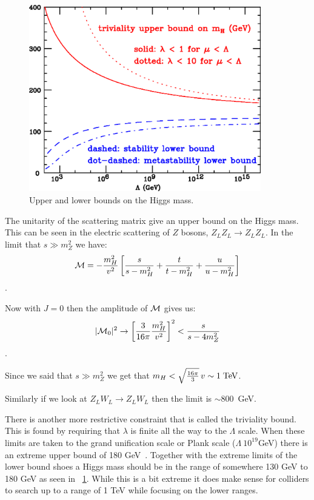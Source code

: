 \begin{figure}[htb]
\centering
\includegraphics[width=0.9\textwidth]{StandardModel/bothbounds.eps}
\caption{Upper and lower bounds on the Higgs mass.~\cite{Ridolfi2001} }
\label{fig:bothbounds}
\end{figure}



The unitarity of the scattering matrix give an upper bound on the Higgs mass.  This can be seen in the electric scattering of $Z$ bosons, $Z_L Z_L \to Z_L Z_L$.  In the limit that $s\gg m_Z^2$ we have:
\begin{equation} {\cal M}=-\frac{m_H^2}{v^2}\left[\frac{s}{s-m_H^2}+\frac{t}{t-m_H^2}+\frac{u}{u-m_H^2}\right] \label{eq:unitarity1}\end{equation}.

Now with $J=0$ then the amplitude of ${\cal M}$ gives us:
\begin{equation}|{\cal M}_0|^2\to\left[\frac{3}{16\pi}\frac{m_H^2}{v^2}\right]^2<\frac{s}{s-4m_Z^2}\label{eq:unitarity2}\end{equation}.

Since we said that $s\gg m_Z^2$ we get that $m_H<\sqrt{\frac{16\pi}{3}}\,v\sim 1\;{\rm TeV}$.

Similarly if we look at $Z_L W_L \to Z_L W_L$ then the limit is $\sim 800$~GeV.


There is another more restrictive constraint that is called the triviality bound. This is found by requiring that $\lambda$ is finite all the way to the $\Lambda$ scale.  When these limits are taken to the grand unification scale or Plank scale ($\Lambda ~ 10^{19}$GeV) there is an extreme upper bound of 180 GeV~\cite{Ridolfi2001}.  Together with the extreme limits of the lower bound shoes a Higgs mass should be in the range  of somewhere 130 GeV to 180 GeV as seen in ~\ref{fig:bothbounds}.  While this is a bit extreme it does make sense for colliders to search up to a range of 1 TeV while focusing on the lower ranges.

